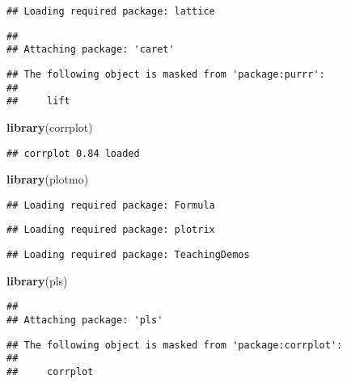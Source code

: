 \documentclass[
]{article}
\newenvironment{Shaded}{\begin{snugshade}}{\end{snugshade}}
\newcommand{\KeywordTok}[1]{\textcolor[rgb]{0.13,0.29,0.53}{\textbf{#1}}}
\newcommand{\NormalTok}[1]{#1}
\begin{document}
\begin{verbatim}
## Loading required package: lattice
\end{verbatim}

\begin{verbatim}
## 
## Attaching package: 'caret'
\end{verbatim}

\begin{verbatim}
## The following object is masked from 'package:purrr':
## 
##     lift
\end{verbatim}

\begin{Shaded}
\begin{Highlighting}[]
\KeywordTok{library}\NormalTok{(corrplot)}
\end{Highlighting}
\end{Shaded}

\begin{verbatim}
## corrplot 0.84 loaded
\end{verbatim}

\begin{Shaded}
\begin{Highlighting}[]
\KeywordTok{library}\NormalTok{(plotmo)}
\end{Highlighting}
\end{Shaded}

\begin{verbatim}
## Loading required package: Formula
\end{verbatim}

\begin{verbatim}
## Loading required package: plotrix
\end{verbatim}

\begin{verbatim}
## Loading required package: TeachingDemos
\end{verbatim}

\begin{Shaded}
\begin{Highlighting}[]
\KeywordTok{library}\NormalTok{(pls)}
\end{Highlighting}
\end{Shaded}

\begin{verbatim}
## 
## Attaching package: 'pls'
\end{verbatim}

\begin{verbatim}
## The following object is masked from 'package:corrplot':
## 
##     corrplot
\end{verbatim}
\end{document}
